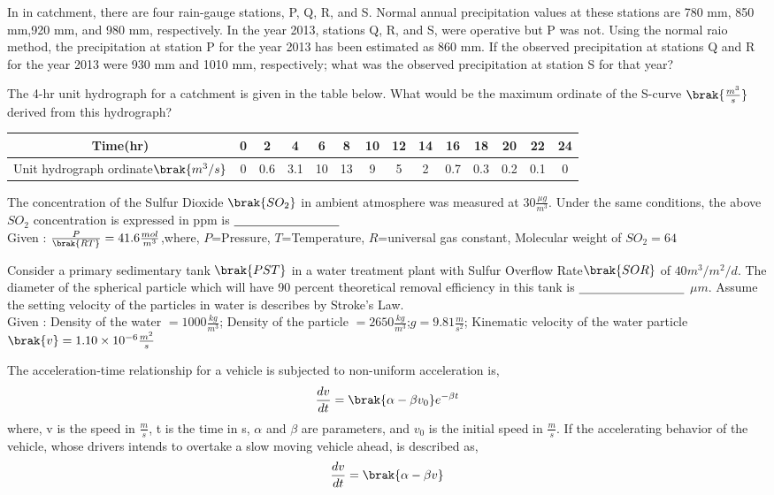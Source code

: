\item In in catchment, there are four rain-gauge stations, P, Q, R, and S. Normal annual precipitation values at these stations are 780 mm, 850 mm,920 mm, and 980 mm, respectively. In the year 2013, stations Q, R, and S, were operative but P was not. Using the normal raio method, the precipitation at station P for the year 2013 has been estimated as 860 mm. If the observed precipitation at stations Q and R for the year 2013 were 930 mm and 1010 mm, respectively; what was the observed precipitation  at station S for that year?

\item The 4-hr unit hydrograph for a catchment is given in the table below. What would be the maximum ordinate of the S-curve $\brak{\frac{m^3}{s}}$ derived from this hydrograph?
\begin{table}[h!]    
\centering
\begin{tabular}[12pt]{|c| c| c| c| c| c| c| c| c| c| c| c| c| c|}
\hline
Time(hr) & 0 & 2 & 4 & 6 & 8 & 10 & 12 & 14 & 16 & 18 & 20 & 22 & 24\\
\hline
Unit hydrograph ordinate$\brak{m^3/s}$ & 0 & 0.6 & 3.1 & 10 & 13 & 9 & 5 & 2 & 0.7 & 0.3 & 0.2 & 0.1 & 0\\
\hline
\end{tabular}
\end{table}
\item The concentration of the Sulfur Dioxide $\brak{SO_2}$ in ambient atmosphere was measured at $ 30 \frac{\mu g}{m^3}$. Under the same conditions, the above $SO_2$ concentration is expressed in ppm is  $\makebox[3cm][l]{\underline{\hspace{3cm}}}$\\
Given : $\frac{P}{\brak{RT}}=41.6\frac{mol}{m^3}$,where, $P$=Pressure, $T$=Temperature, $R$=universal gas constant,  Molecular weight of $SO_2=64$
\item Consider a primary sedimentary tank $\brak{PST}$ in a water treatment plant with  Sulfur Overflow Rate$\brak{SOR}$ of $40m^3/m^2/d.$ The diameter of the spherical particle which will have 90 percent theoretical removal efficiency in this tank is $\makebox[3cm][l]{\underline{\hspace{3cm}}}$ $\mu m$. Assume the setting velocity of the particles in water is describes by Stroke's Law.\\
Given : Density of the water $= 1000 \frac{kg}{m^3}$; Density of the particle $=2650 \frac{kg}{m^3}$;$g=9.81 \frac{m}{s^2}$; Kinematic velocity of the water particle$\brak{v}=1.10 \times 10^{-6} \frac{m^2}{s}$
\item The acceleration-time relationship for a vehicle is subjected to non-uniform acceleration is, $$\frac{dv}{dt}=\brak{\alpha - \beta v_0} e^{-\beta t}$$ where, v is the speed in $\frac{m}{s}$, t is the time in s, $\alpha$ and $\beta$ are parameters, and $v_0$ is the initial speed in $\frac{m}{s}$. If the accelerating behavior of the vehicle, whose drivers intends to overtake a slow moving vehicle ahead, is described as, $$\frac{dv}{dt} = \brak{\alpha - {\beta}v}$$

